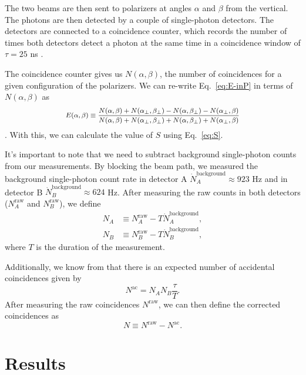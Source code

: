 \documentclass{../paper}
\newcommand{\eq}[1]{Eq.~\eqref{#1}}
\begin{document}
The two beams are then sent to polarizers at angles $\alpha$ and $\beta$ from the vertical. The photons are then detected by a couple of single-photon detectors. The detectors are connected to a coincidence counter, which records the number of times both detectors detect a photon at the same time in a coincidence window of $\tau = 25$ ns \cite{LabManual}.

The coincidence counter gives us $N(\alpha,\beta)$, the number of coincidences for a given configuration of the polarizers. We can re-write \eq{eq:E-inP} in terms of $N(\alpha,\beta)$ as
\begin{equation}\label{eq:E}
  \footnotesize
  \begin{aligned}
    E(\alpha,\beta) \equiv \frac{N(\alpha,\beta) + N(\alpha_\perp,\beta_\perp) - N(\alpha,\beta_\perp) - N(\alpha_\perp,\beta)}{N(\alpha,\beta) + N(\alpha_\perp,\beta_\perp) + N(\alpha,\beta_\perp) + N(\alpha_\perp,\beta)}
  \end{aligned}
\end{equation}
\cite{Dehlinger2002}. With this, we can calculate the value of $S$ using \eq{eq:S}.

It's important to note that we need to subtract background single-photon counts from our measurements. By blocking the beam path, we measured the background single-photon count rate in detector A $\dot N_A^\text{background} \approx 923$ Hz and in detector B $\dot N_B^\text{background} \approx 624$ Hz. After measuring the raw counts in both detectors ($N_A^\text{raw}$ and $N_B^\text{raw}$), we define
\begin{align}
  N_A &\equiv N_A^\text{raw} - T \dot N_A^\text{background}, \\
  N_B &\equiv N_B^\text{raw} - T \dot N_B^\text{background},
\end{align}
where $T$ is the duration of the measurement.

Additionally, we know from \cite{LabManual} that there is an expected number of accidental coincidences given by
\begin{equation}
  N^\text{ac} = N_A N_B \frac{\tau}{T}.
\end{equation}
After measuring the raw coincidences $N^\text{raw}$, we can then define the corrected coincidences as
\begin{equation}
  N \equiv N^\text{raw} - N^\text{ac}.
\end{equation}

\section{Results}\label{sec:results}
\end{document}
